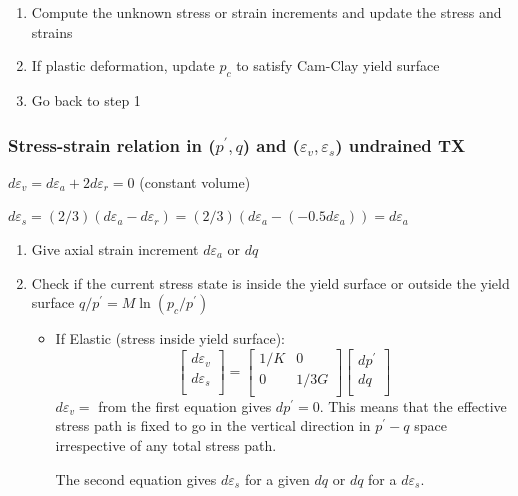 \documentclass[notes]{beamer}
\begin{document}
\begin{frame}
\begin{enumerate}
\begin{enumerate}
\begin{equation*}
\begin{bmatrix}
		M - (q/p^\prime) & 1     \\
		1 & 1/(M - (q/p^\prime)) \\
		\end{bmatrix}
		\right]
		\end{equation*}
	\end{enumerate}
	\item Compute the unknown stress or strain increments and update the stress and strains
	\item If plastic deformation, update $p_c$ to satisfy Cam-Clay yield surface
	\item Go back to step 1
\end{enumerate}
\end{frame}


\begin{frame}
\frametitle{Stress-strain relation in ($p^\prime, q$) and ($\varepsilon_v, \varepsilon_s$) undrained TX}
$d\varepsilon_v = d\varepsilon_a + 2 d\varepsilon_r = 0$ (constant volume)

$d\varepsilon_s = (2/3)(d\varepsilon_a - d\varepsilon_r) = (2/3)(d\varepsilon_a - (-0.5 d\varepsilon_a)) = d\varepsilon_a$
\begin{enumerate}
\item Give axial strain increment $d\varepsilon_a$ or $dq$
\item Check if the current stress state is inside the yield surface or outside the yield surface $q/p^\prime = M \ln (p_c/p^\prime)$
\begin{itemize}
	\item If Elastic (stress inside yield surface):
	\begin{equation*}
	\begin{bmatrix}
	d\varepsilon_v \\
	d\varepsilon_s \\
	\end{bmatrix} = %
	\begin{bmatrix}
	1/K & 0 \\
	0 & 1/3G\\
	\end{bmatrix} %
	\begin{bmatrix}
	dp^\prime \\
	dq\\
	\end{bmatrix}
	\end{equation*}
	$d\varepsilon_v =$ from the first equation gives $dp^\prime = 0$. This means that the effective stress path is fixed to go in the vertical direction in $p^\prime - q$ space irrespective of any total stress path. 
	
	The second equation gives $d\varepsilon_s$ for a given $dq$ or $dq$ for a $d\varepsilon_s$.
\end{itemize}
\end{enumerate}
\end{frame}
\end{document}
